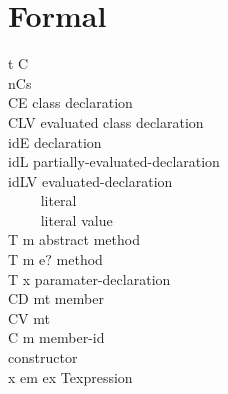 \section{Formal} 
\begin{bnf}
     {t \mmid{} C}                                                      {}\\      {nCs}                                                 {}\\     {C\eq{}E}                                                          {class declaration}\\     {C\eq{}LV}                                                         {evaluated class declaration}\\      {id\eq{}E}                                                         {declaration}\\     {id\eq{}L}                                                         {partially-evaluated-declaration}\\     {id\eq{}LV}                                                       {evaluated-declaration}\\      {\ \ \mmid{}\ \ }        {literal}\\     {\ \ \mmid{}\ \ }       {literal value}\\    {T m}                                                      {abstract method}\\     {T m e$?$}                                                 {method}\\     {T x}                                                              {paramater-declaration}\\      {CD \mmid{} mt}                                                    {member}\\     {CV \mmid{} mt}                                                    {}\\    {C \mmid{} m}                                                      {member-id}\\      {}                                          {constructor}\\      {x \mmid{} em \mmid{} ex \mmid{}  T}{expression}\\\production{%
}
\end{bnf}
